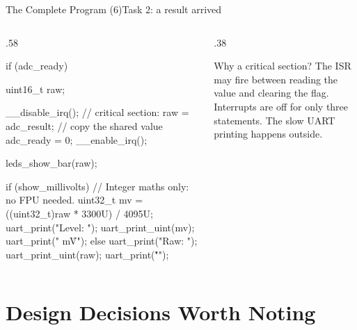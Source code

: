 \documentclass[9pt,aspectratio=169,xcolor=table]{beamer}
\begin{document}
\begin{frame}[fragile]{The Complete Program (6)}{Task 2: a result arrived}
    \begin{columns}[T]
    \begin{column}{.58\textwidth}
\begin{cc}[basicstyle=\ttfamily\scriptsize]
if (adc_ready) {
    uint16_t raw;

    __disable_irq();            // critical section:
    raw       = adc_result;     // copy the shared value
    adc_ready = 0;
    __enable_irq();

    leds_show_bar(raw);

    if (show_millivolts) {
        // Integer maths only: no FPU needed.
        uint32_t mv = ((uint32_t)raw * 3300U) / 4095U;
        uart_print("Level: ");
        uart_print_uint(mv);
        uart_print(" mV\r\n");
    } else {
        uart_print("Raw:   ");
        uart_print_uint(raw);
        uart_print("\r\n");
    }
}
\end{cc}
    \end{column}
    \begin{column}{.38\textwidth}
        \begin{block}{Why a critical section?}
            {\small The ISR may fire between reading the value and clearing the flag. Interrupts are off for only \alert{three statements}. The slow UART printing happens outside.}
        \end{block}
    \end{column}
    \end{columns}
\end{frame}


\section{Design Decisions Worth Noting}
\end{document}

